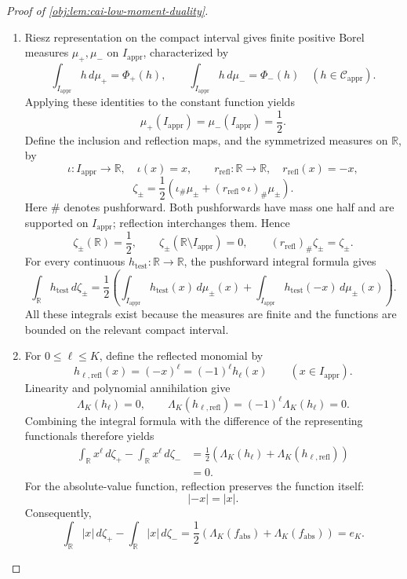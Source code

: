 \begin{proof}[Proof of \cref{obj:lem:cai-low-moment-duality}]
\begin{enumerate}
\item Riesz representation on the compact interval gives finite positive Borel measures \(\mu_+,\mu_-\) on \(I_{\mathrm{appr}}\), characterized by
\[
\int_{I_{\mathrm{appr}}}h\,d\mu_+=\Phi_+(h),\qquad
\int_{I_{\mathrm{appr}}}h\,d\mu_-=\Phi_-(h)
\quad(h\in\mathcal C_{\mathrm{appr}}).
\]
Applying these identities to the constant function yields
\[
\mu_+(I_{\mathrm{appr}})=\mu_-(I_{\mathrm{appr}})=\frac12.
\]
Define the inclusion and reflection maps, and the symmetrized measures on \(\mathbb R\), by
\[
\iota:I_{\mathrm{appr}}\longrightarrow\mathbb R,\quad \iota(x)=x,
\qquad
r_{\mathrm{refl}}:\mathbb R\longrightarrow\mathbb R,\quad
r_{\mathrm{refl}}(x)=-x,
\]
\[
\zeta_\pm
=\frac12\left(\iota_\#\mu_\pm
 +(r_{\mathrm{refl}}\circ\iota)_\#\mu_\pm\right).
\]
Here \(\#\) denotes pushforward. Both pushforwards have mass one half and are supported on \(I_{\mathrm{appr}}\); reflection interchanges them. Hence
\[
\zeta_\pm(\mathbb R)=\frac12,\qquad
\zeta_\pm(\mathbb R\setminus I_{\mathrm{appr}})=0,\qquad
(r_{\mathrm{refl}})_\#\zeta_\pm=\zeta_\pm.
\]
For every continuous \(h_{\mathrm{test}}:\mathbb R\to\mathbb R\), the pushforward integral formula gives
\[
\int_{\mathbb R}h_{\mathrm{test}}\,d\zeta_\pm
=\frac12\left(
\int_{I_{\mathrm{appr}}}h_{\mathrm{test}}(x)\,d\mu_\pm(x)
+\int_{I_{\mathrm{appr}}}h_{\mathrm{test}}(-x)\,d\mu_\pm(x)
\right).
\]
All these integrals exist because the measures are finite and the functions are bounded on the relevant compact interval.

\item For \(0\le\ell\le K\), define the reflected monomial by
\[
h_{\ell,\mathrm{refl}}(x)=(-x)^\ell=(-1)^\ell h_\ell(x)
\qquad(x\in I_{\mathrm{appr}}).
\]
Linearity and polynomial annihilation give
\[
\Lambda_K(h_\ell)=0,\qquad
\Lambda_K(h_{\ell,\mathrm{refl}})
=(-1)^\ell\Lambda_K(h_\ell)=0.
\]
Combining the integral formula with the difference of the representing functionals therefore yields
\[
\begin{aligned}
\int_{\mathbb R}x^\ell\,d\zeta_+
-\int_{\mathbb R}x^\ell\,d\zeta_-
&=\frac12\left(
\Lambda_K(h_\ell)+\Lambda_K(h_{\ell,\mathrm{refl}})
\right)\\
&=0.
\end{aligned}
\]
For the absolute-value function, reflection preserves the function itself:
\[
|-x|=|x|.
\]
Consequently,
\[
\int_{\mathbb R}|x|\,d\zeta_+
-\int_{\mathbb R}|x|\,d\zeta_-
=\frac12\left(
\Lambda_K(f_{\mathrm{abs}})+\Lambda_K(f_{\mathrm{abs}})
\right)
=e_K.
\]


\end{enumerate}
\end{proof}
